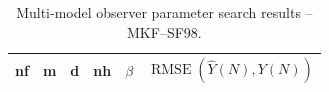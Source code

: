 \begin{table}[hb]
	\begin{center}
		\caption{Multi-model observer parameter search results – MKF--SF98.} \label{tb:obs-sim2-popt-SF98}
		\begin{tabular}{p{}>{\centering\arraybackslash}p{}>{\centering\arraybackslash}p{}>{\centering\arraybackslash}p{}>{\centering\arraybackslash}p{}>{\centering\arraybackslash}p{}}
			\gls{nf} & \gls{m}  & \gls{d}  & \gls{nh} & $\beta$ & $\operatorname{RMSE}(\hat{Y}(N),Y(N))$  \\
			\hline

\end{tabular}
\end{center}
\end{table}
